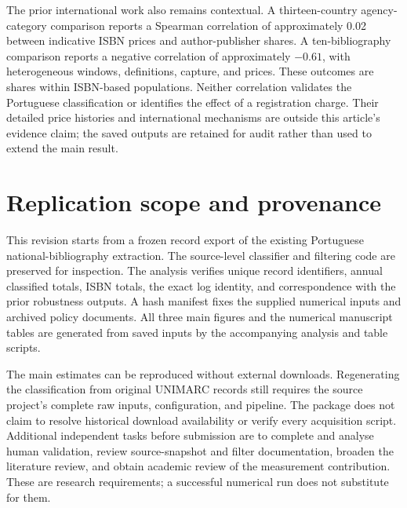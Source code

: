 \documentclass[11pt]{article}
\begin{document}
The prior international work also remains contextual. A thirteen-country agency-category comparison reports a Spearman correlation of approximately 0.02 between indicative ISBN prices and author-publisher shares. A ten-bibliography comparison reports a negative correlation of approximately $-0.61$, with heterogeneous windows, definitions, capture, and prices. These outcomes are shares within ISBN-based populations. Neither correlation validates the Portuguese classification or identifies the effect of a registration charge. Their detailed price histories and international mechanisms are outside this article's evidence claim; the saved outputs are retained for audit rather than used to extend the main result.

\section{Replication scope and provenance}
\label{app:population}



This revision starts from a frozen record export of the existing Portuguese national-bibliography extraction. The source-level classifier and filtering code are preserved for inspection. The analysis verifies unique record identifiers, annual classified totals, ISBN totals, the exact log identity, and correspondence with the prior robustness outputs. A hash manifest fixes the supplied numerical inputs and archived policy documents. All three main figures and the numerical manuscript tables are generated from saved inputs by the accompanying analysis and table scripts.

The main estimates can be reproduced without external downloads. Regenerating the classification from original UNIMARC records still requires the source project's complete raw inputs, configuration, and pipeline. The package does not claim to resolve historical download availability or verify every acquisition script. Additional independent tasks before submission are to complete and analyse human validation, review source-snapshot and filter documentation, broaden the literature review, and obtain academic review of the measurement contribution. These are research requirements; a successful numerical run does not substitute for them.
\end{document}
